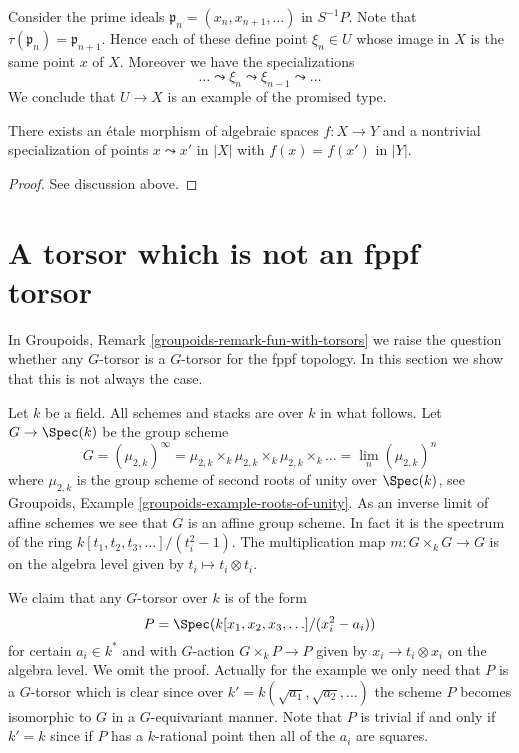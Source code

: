 \medskip\noindent
Consider the prime ideals $\mathfrak p_n = (x_n, x_{n + 1}, \ldots)$ in
$S^{-1}P$. Note that $\tau(\mathfrak p_n) = \mathfrak p_{n + 1}$.
Hence each of these define point $\xi_n \in U$ whose image in $X$ is
the same point $x$ of $X$. Moreover we have the specializations
$$
\ldots \leadsto \xi_n \leadsto \xi_{n - 1} \leadsto \ldots
$$
We conclude that $U \to X$ is an example of the promised type.

\begin{lemma}
\label{lemma-specializations-fibre-etale}
There exists an \'etale morphism of algebraic spaces $f : X \to Y$
and a nontrivial specialization of points $x \leadsto x'$ in $|X|$ with
$f(x) = f(x')$ in $|Y|$.
\end{lemma}

\begin{proof}
See discussion above.
\end{proof}







\section{A torsor which is not an fppf torsor}
\label{section-torsor-not-fppf}

\noindent
In
Groupoids, Remark \ref{groupoids-remark-fun-with-torsors}
we raise the question whether any $G$-torsor is a $G$-torsor for the
fppf topology. In this section we show that this is not always the case.

\medskip\noindent
Let $k$ be a field. All schemes and stacks are over $k$ in what follows.
Let $G \to \Spec(k)$ be the group scheme
$$
G = (\mu_{2, k})^\infty =
\mu_{2, k} \times_k \mu_{2, k} \times_k \mu_{2, k} \times_k \ldots =
\lim_n (\mu_{2, k})^n
$$
where $\mu_{2, k}$ is the group scheme of second roots of unity over
$\Spec(k)$, see
Groupoids, Example \ref{groupoids-example-roots-of-unity}.
As an inverse limit of affine schemes we see that $G$ is an affine group
scheme. In fact it is the spectrum of the ring
$k[t_1, t_2, t_3, \ldots]/(t_i^2 - 1)$. The multiplication map
$m : G \times_k G \to G$ is on the algebra level given by
$t_i \mapsto t_i \otimes t_i$.

\medskip\noindent
We claim that any $G$-torsor over $k$ is of the form
$$
P = \Spec(k[x_1, x_2, x_3, \ldots]/(x_i^2 - a_i))
$$
for certain $a_i \in k^*$ and with $G$-action $G \times_k P \to P$
given by $x_i \to t_i \otimes x_i$ on the algebra level.
We omit the proof.
Actually for the example we only need that $P$ is a $G$-torsor
which is clear since over $k' = k(\sqrt{a_1}, \sqrt{a_2}, \ldots)$
the scheme $P$ becomes isomorphic to $G$ in a $G$-equivariant manner.
Note that $P$ is trivial if and only if $k' = k$ since if
$P$ has a $k$-rational point then all of the $a_i$ are squares.

